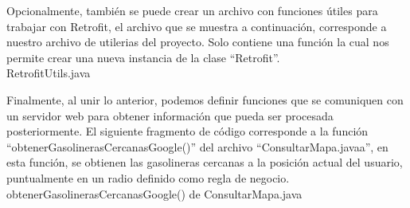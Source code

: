 

Opcionalmente, también se puede crear un archivo con funciones útiles para trabajar con Retrofit, el archivo que se muestra a continuación, corresponde a nuestro archivo de utilerias del proyecto. Solo contiene una función la cual nos permite crear una nueva instancia de la clase ``Retrofit''.\\RetrofitUtils.java


Finalmente, al unir lo anterior, podemos definir funciones que se comuniquen con un servidor web para obtener información que pueda ser procesada posteriormente. El siguiente fragmento de código corresponde a la función ``obtenerGasolinerasCercanasGoogle()'' del archivo ``ConsultarMapa.javaa'', en esta función, se obtienen las gasolineras cercanas a la posición actual del usuario, puntualmente en un radio definido como regla de negocio.
\\obtenerGasolinerasCercanasGoogle() de ConsultarMapa.java



